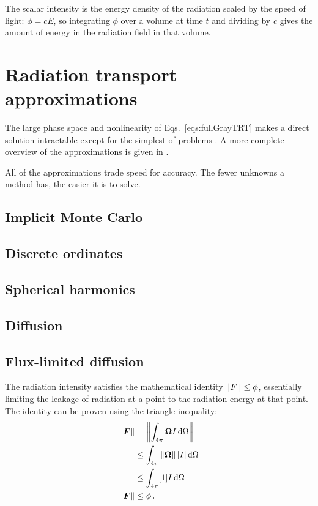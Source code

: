 The scalar
intensity is the energy density of the radiation scaled by the speed of light:
$\phi=cE$, so integrating $\phi$ over a volume at time $t$ and dividing by $c$
gives the amount of energy in the radiation field in that volume.
\section{Radiation transport approximations}\label{sec:trtApproxMethods}

The large phase space and nonlinearity of Eqs.~\eqref{eqs:fullGrayTRT} makes a
direct solution intractable except for the simplest of problems
\cite{Su1997,Mos2006}. A more complete overview of the approximations is given
in \cite{Bru2002,Ols2000,Wol2008}.

All of the approximations trade speed for accuracy. The fewer unknowns a method
has, the easier it is to solve.

\subsection{Implicit Monte Carlo}

\subsection{Discrete ordinates}

\subsection{Spherical harmonics}
\cite{McC2008a}

\subsection{Diffusion}\label{sec:diffusion}

\subsection{Flux-limited diffusion}\label{sec:fldBackground}

The radiation intensity satisfies the mathematical identity $\left\| F \right\| \le \phi$,
essentially limiting the leakage of radiation at a point to the radiation
energy at that point. The identity can be proven using the triangle inequality:
\begin{align*}
  \left\| \bm{F} \right\| &= \left\|  \int_{4\pi} \bm{\Omega} I \mathop{}\!\mathrm{d} \Omega \right\|
  \\&\le \int_{4\pi} \left\| \bm{\Omega} \right\| \left| I \right| \mathop{}\!\mathrm{d} \Omega 
  \\
  &\le \int_{4\pi} [1] I \mathop{}\!\mathrm{d}\Omega
  \\
  \left\| \bm{F} \right\| &\le \phi\,.
\end{align*}

